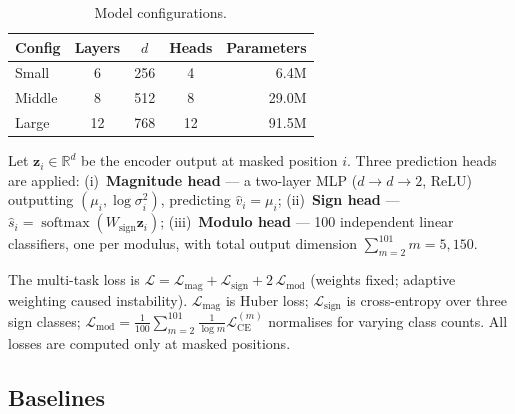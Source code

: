 \begin{table}[t]
\caption{Model configurations.}
\label{tab:models}
\centering
\begin{tabular}{lcccr}
\hline
Config  & Layers & $d$ & Heads & Parameters \\
\hline
Small   & 6      & 256 & 4     & 6.4M       \\
Middle  & 8      & 512 & 8     & 29.0M      \\
Large   & 12     & 768 & 12    & 91.5M      \\
\hline
\end{tabular}
\end{table}

Let $\mathbf{z}_i \in \mathbb{R}^d$ be the encoder output at masked position $i$.
Three prediction heads are applied: (i)~\textbf{Magnitude head} --- a two-layer MLP
($d \to d \to 2$, ReLU) outputting $(\mu_i, \log\sigma_i^2)$, predicting $\hat{v}_i = \mu_i$;
(ii)~\textbf{Sign head} --- $\hat{s}_i = \operatorname{softmax}(W_{\text{sign}}\mathbf{z}_i)$;
(iii)~\textbf{Modulo head} --- 100 independent linear classifiers, one per modulus, with total
output dimension $\sum_{m=2}^{101}m = 5{,}150$.

The multi-task loss is $\mathcal{L} = \mathcal{L}_{\text{mag}} + \mathcal{L}_{\text{sign}} + 2\,\mathcal{L}_{\text{mod}}$
(weights fixed; adaptive weighting caused instability).
$\mathcal{L}_{\text{mag}}$ is Huber loss; $\mathcal{L}_{\text{sign}}$ is cross-entropy over
three sign classes; $\mathcal{L}_{\text{mod}} = \frac{1}{100}\sum_{m=2}^{101}
\frac{1}{\log m}\mathcal{L}_{\text{CE}}^{(m)}$ normalises for varying class counts.
All losses are computed only at masked positions.

\subsection{Baselines}
\label{sec:baselines}

